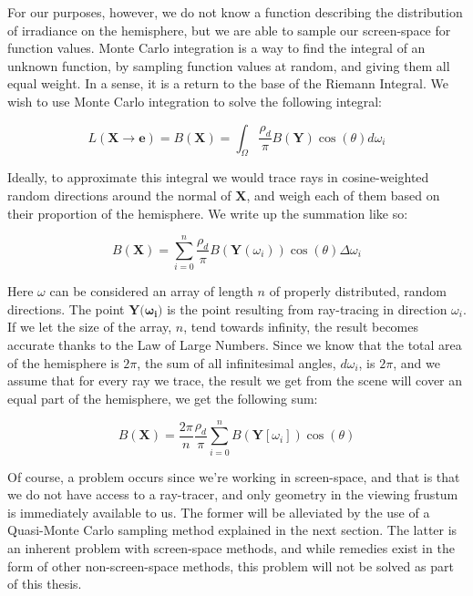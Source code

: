 For our purposes, however, we do not know a function describing the distribution of irradiance on the hemisphere, but we are able to sample our screen-space for function values. Monte Carlo integration is a way to find the integral of an unknown function, by sampling function values at random, and giving them all equal weight. In a sense, it is a return to the base of the Riemann Integral. We wish to use Monte Carlo integration to solve the following integral:

$$L(\mathbf{X} \rightarrow \mathbf{e}) = B(\mathbf{X}) = \int_\Omega \frac{\rho_d}{\pi} B(\mathbf{Y}) \cos(\theta) d\omega_i$$

Ideally, to approximate this integral we would trace rays in cosine-weighted random directions around the normal of $\mathbf{X}$, and weigh each of them based on their proportion of the hemisphere. We write up the summation like so:

$$B(\mathbf{X}) = \sum_{i=0}^{n} \frac{\rho_d}{\pi} B(\mathbf{Y}(\omega_i)) \cos(\theta) \Delta \omega_i$$

Here $\omega$ can be considered an array of length $n$ of properly distributed, random directions. The point $\mathbf{Y(\omega_i})$ is the point resulting from ray-tracing in direction $\omega_i$. If we let the size of the array, $n$, tend towards infinity, the result becomes accurate thanks to the Law of Large Numbers. Since we know that the total area of the hemisphere is $2\pi$, the sum of all infinitesimal angles, $d\omega_i$, is $2\pi$, and we assume that for every ray we trace, the result we get from the scene will cover an equal part of the hemisphere, we get the following sum:

$$B(\mathbf{X}) = \frac{2\pi}{n} \frac{\rho_d}{\pi} \sum_{i=0}^{n} B(\mathbf{Y}[\omega_i]) \cos(\theta)$$

Of course, a problem occurs since we're working in screen-space, and that is that we do not have access to a ray-tracer, and only geometry in the viewing frustum is immediately available to us. The former will be alleviated by the use of a Quasi-Monte Carlo sampling method explained in the next section. The latter is an inherent problem with screen-space methods, and while remedies exist in the form of other non-screen-space methods, this problem will not be solved as part of this thesis.

